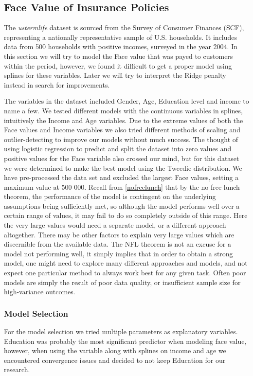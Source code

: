 \documentclass[12pt, twoside,hidelinks]{article}
\theoremstyle{definition}
\numberwithin{equation}{section}
\begin{document}
\subsection{Face Value of Insurance Policies}\label{sec:analysis:face_value}

The \textit{ustermlife} dataset is sourced from the Survey of Consumer Finances (SCF), representing a nationally representative sample of U.S. households. It includes data from 500 households with positive incomes, surveyed in the year 2004. In this section we will try to model the Face value that was payed to customers within the period, however, we found it difficult to get a proper model using splines for these variables. Later we will try to interpret the Ridge penalty instead in search for improvements.
\newline

The variables in the dataset included Gender, Age, Education level and income to name a few. We tested different models with the continuous variables in splines, intuitively the Income and Age variables. Due to the extreme values of both the Face values and Income variables we also tried different methods of scaling and outlier-detecting to improve our models without much success. The thought of using logistic regression to predict and split the dataset into zero values and positive values for the Face variable also crossed our mind, but for this dataset we were determined to make the best model using the Tweedie distribution. 
We have pre-processed the data set and excluded the largest Face values, setting a maximum value at 500 000. Recall from \ref{nofreelunch} that by the no free lunch theorem, the performance of the model is contingent on the underlying assumptions being sufficiently met, so although the model performs well over a certain range of values, it may fail to do so completely outside of this range. Here the very large values would need a separate model, or a different approach altogether. There may be other factors to explain very large values which are discernible from the available data. The NFL theorem is not an excuse for a model not performing well, it simply implies that in order to obtain a strong model, one might need to explore many different approaches and models, and not expect one particular method to always work best for any given task. Often poor models are simply the result of poor data quality, or insufficient sample size for high-variance outcomes. 




\subsubsection{Model Selection}
For the model selection we tried multiple parameters as explanatory variables. Education was probably the most significant predictor when modeling face value, however, when using the variable along with splines on income and age we encountered convergence issues and decided to not keep Education for our research. 
\end{document}
